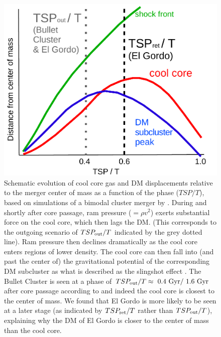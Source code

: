 \documentclass[letterpaper,useAMS,usenatbib]{mn2e}
\begin{document}
\begin{figure}
	\includegraphics[width=\linewidth]{merger_scenario.pdf}
 \caption{Schematic evolution of cool core gas and DM displacements relative to the
merger center of mass as a function of the phase ($TSP / T$), based on
simulations of a bimodal cluster merger by \citet{Mathis05}. During and
shortly after core passage, ram pressure ($=\rho v^2$) exerts substantial
force on the cool core, which then lags the DM. (This corresponds to the
outgoing scenario of $TSP_{\rm out} / T$ indicated by the grey dotted line). Ram
pressure then declines dramatically as the cool core enters regions of
lower density.  The cool core can then fall into (and past the center of)
the gravitational potential of the corresponding DM subcluster as what is
described as the slingshot effect \citep{Markevitch2007}.  The Bullet
Cluster is seen at a phase of $TSP_{\rm out} / T \approx ~0.4\text{ Gyr} / ~1.6
\text{ Gyr}$ after core passage according
to  and indeed the cool core is closest to the center of
mass. We found that El Gordo is more likely to be seen at a later stage (as
indicated by $TSP_{\rm ret} / T$ rather than $TSP_{\rm out} / T$), explaining why the DM of
El Gordo is closer to the center of mass than the cool core. \label{fig:merger_scenario}}
\end{figure}
	
\end{document}
